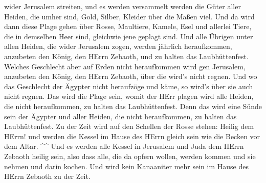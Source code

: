 wider Jerusalem streiten, und es werden versammelt werden die Güter
aller Heiden, die umher sind, Gold, Silber, Kleider über die Maßen viel.
 Und da wird dann diese Plage gehen über Rosse, Maultiere,
Kamele, Esel und allerlei Tiere, die in demselben Heer sind, gleichwie
jene geplagt sind.  Und alle Übrigen unter allen Heiden,
die wider Jerusalem zogen, werden jährlich heraufkommen, anzubeten den
König, den HErrn Zebaoth, und zu halten das Laubhüttenfest.
 Welches Geschlecht aber auf Erden nicht heraufkommen wird
gen Jerusalem, anzubeten den König, den HErrn Zebaoth, über die wird's
nicht regnen.  Und wo das Geschlecht der Ägypter nicht
heraufzöge und käme, so wird's über sie auch nicht regnen. Das wird die
Plage sein, womit der HErr plagen wird alle Heiden, die nicht
heraufkommen, zu halten das Laubhüttenfest.  Denn das wird
eine Sünde sein der Ägypter und aller Heiden, die nicht heraufkommen, zu
halten das Laubhüttenfest.  Zu der Zeit wird auf den
Schellen der Rosse stehen: Heilig dem HErrn! und werden die Kessel im
Hause des HErrn gleich sein wie die Becken vor dem Altar. \^{}\^{}
 Und es werden alle Kessel in Jerusalem und Juda dem HErrn
Zebaoth heilig sein, also dass alle, die da opfern wollen, werden kommen
und sie nehmen und darin kochen. Und wird kein Kanaaniter mehr sein im
Hause des HErrn Zebaoth zu der Zeit.
